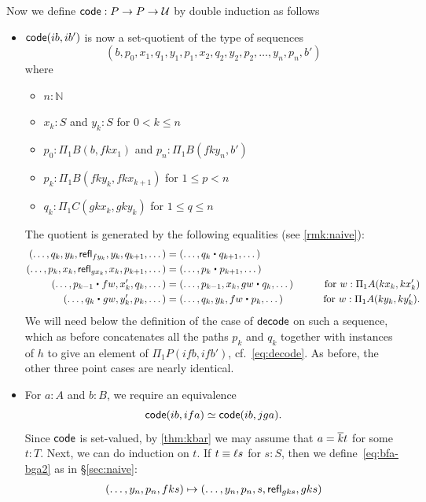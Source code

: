 Now we define $\mathsf{code}:P\to P\to \mathcal{U}$ by double induction as follows
\begin{itemize}
\item $\mathsf{code}(ib,ib')$ is now a set-quotient of the type of sequences
  \[ (b, p_0, x_1, q_1, y_1, p_1, x_2, q_2, y_2, p_2, \dots, y_n, p_n, b') \]
  where
  \begin{itemize}
  \item $n:\mathbb{N}$
  \item $x_k:S$ and $y_k:S$ for $0<k \le n$
  \item $p_0:\Pi_1B(b,f k x_1)$ and $p_n:\Pi_1B(f k y_n, b')$
  \item $p_k:\Pi_1B(fk y_k, fkx_{k+1})$ for $1\le p < n$
  \item $q_k:\Pi_1C(gkx_k, gky_k)$ for $1\le q\le n$
  \end{itemize}
  The quotient is generated by the following equalities (see \autoref{rmk:naive}):
  \begin{alignat*}{2}
    (\dots, q_k, y_k, \refl{fy_k}, y_k, q_{k+1},\dots)
    &= (\dots, q_k\ct q_{k+1},\dots)\\
    (\dots, p_k, x_k, \refl{gx_k}, x_k, p_{k+1},\dots)
    &= (\dots, p_k\ct p_{k+1},\dots)\\
    (\dots, p_{k-1} \ct fw, x_{k}', q_{k}, \dots) &=
    (\dots, p_{k-1}, x_{k}, gw \ct q_{k}, \dots)
    & \qquad\text{for } w:\Pi_1A(kx_{k},kx_{k}')\\
    (\dots, q_k \ct gw, y_k', p_k, \dots) &=
    (\dots, q_k, y_k, fw \ct p_k, \dots)
    & \qquad\text{for } w:\Pi_1A(ky_k, ky_k').
  \end{alignat*}
  We will need below the definition of the case of $\mathsf{decode}$ on such a sequence, which as before concatenates all the paths $p_k$ and $q_k$ together with instances of $h$ to give an element of $\Pi_1P(ifb,ifb')$, cf.~\eqref{eq:decode}.
  As before, the other three point cases are nearly identical.
\item For $a:A$ and $b:B$, we require an equivalence
  \begin{equation}
    \code(ib, ifa) \simeq \code(ib,jga).\label{eq:bfa-bga2}
  \end{equation}
  Since $\mathsf{code}$ is set-valued, by \autoref{thm:kbar} we may assume that $a=\overline{k} t$ for some $t:T$.
  Next, we can do induction on $t$.
  If $t\equiv \ell s$ for $s:S$, then we define~\eqref{eq:bfa-bga2} as in \S\ref{sec:naive}:
  \begin{align*}
    (\dots, y_n, p_n,fks) &\mapsto (\dots,y_n,p_n,s,\refl{gks},gks)\\

\end{align*}
\end{itemize}
